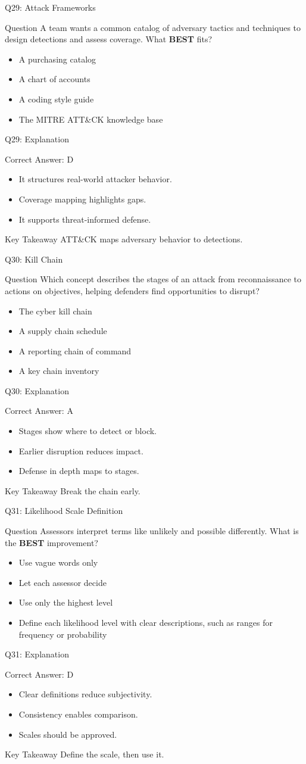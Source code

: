 \documentclass[aspectratio=169]{beamer}
\newcommand{\hq}[7]{%
	\begin{frame}{Q#1: #2}
		\begin{block}{Question}
			#3
		\end{block}
		\begin{itemize}
			#4
		\end{itemize}
	\end{frame}
	\begin{frame}{Q#1: Explanation}
		\begin{block}{Correct Answer: #5}
			\begin{itemize}
				#6
			\end{itemize}
		\end{block}
		\begin{alertblock}{Key Takeaway}
			#7
		\end{alertblock}
	\end{frame}
}
\begin{document}
	\hq{29}{Attack Frameworks}
	{A team wants a common catalog of adversary tactics and techniques to design detections and assess coverage. What \textbf{BEST} fits?}
	{\item[\textbf{(A)}] A purchasing catalog
		\item[\textbf{(B)}] A chart of accounts
		\item[\textbf{(C)}] A coding style guide
		\item[\textbf{(D)}] The MITRE ATT\&CK knowledge base}
	{D}
	{\item It structures real-world attacker behavior.
		\item Coverage mapping highlights gaps.
		\item It supports threat-informed defense.}
	{ATT\&CK maps adversary behavior to detections.}

	\hq{30}{Kill Chain}
	{Which concept describes the stages of an attack from reconnaissance to actions on objectives, helping defenders find opportunities to disrupt?}
	{\item[\textbf{(A)}] The cyber kill chain
		\item[\textbf{(B)}] A supply chain schedule
		\item[\textbf{(C)}] A reporting chain of command
		\item[\textbf{(D)}] A key chain inventory}
	{A}
	{\item Stages show where to detect or block.
		\item Earlier disruption reduces impact.
		\item Defense in depth maps to stages.}
	{Break the chain early.}

	\hq{31}{Likelihood Scale Definition}
	{Assessors interpret terms like unlikely and possible differently. What is the \textbf{BEST} improvement?}
	{\item[\textbf{(A)}] Use vague words only
		\item[\textbf{(B)}] Let each assessor decide
		\item[\textbf{(C)}] Use only the highest level
		\item[\textbf{(D)}] Define each likelihood level with clear descriptions, such as ranges for frequency or probability}
	{D}
	{\item Clear definitions reduce subjectivity.
		\item Consistency enables comparison.
		\item Scales should be approved.}
	{Define the scale, then use it.}
\end{document}
